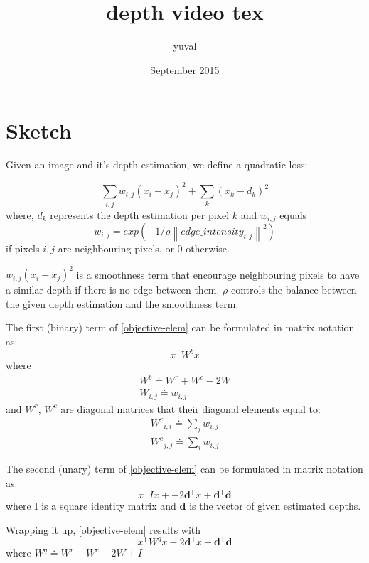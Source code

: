 \documentclass{article}
\title{depth video tex}
\author{yuval }
\date{September 2015}
\newcommand{\norm}[1]{\left\lVert #1 \right\rVert}
\newcommand\mat[1]{{#1}}
\newcommand{\T}{{}^\mathsf{T}}
\newcommand{\eqdef}{\doteq}
\renewcommand\vec[1]{\mathbf{#1}}
\begin{document}
\maketitle

\section{Sketch}

Given an image and it's depth estimation, we define a quadratic loss:

\begin{equation}
\sum_{i,j}{w_{i,j} (x_i  - x_j)^2} + \sum_{k}{(x_k - d_k)^2}
\label{objective-elem}
\end{equation}
where, $d_k$ represents the depth estimation per pixel $k$ and $w_{i,j}$ equals
\begin{equation}
w_{i,j} = exp(-1/\rho \norm{edge\_intensity_{i,j}}^2)
\end{equation}
if pixels $i,j$ are neighbouring pixels, or $0$ otherwise. 

${w_{i,j} (x_i  - x_j)^2}$ is a smoothness term that encourage neighbouring pixels to have a similar depth if there is no edge between them.
$\rho$ controls the balance between the given depth estimation and the smoothness term.

The first (binary) term of \eqref{objective-elem} can be formulated in matrix notation as:
\begin{equation}
x\T \mat{W^{b}} x
\end{equation}
where 
\begin{align}
\mat{W^{b}} \eqdef \mat{W^{r}} + \mat{W^{c}} - 2\mat{W}\\
\mat{W}_{i,j} \eqdef w_{i,j}
\end{align}
and $\mat{W^{r}}$, $\mat{W^{c}}$ are diagonal matrices that their diagonal elements equal to:
\begin{align}
\mat{W^{r}}_{i,i} \eqdef \sum_{j}{w_{i,j}}\\ \mat{W^{c}}_{j,j} \eqdef \sum_{i}{w_{i,j}} \end{align}

The second (unary) term of \eqref{objective-elem} can be formulated in matrix notation as:
\begin{equation}
x\T \mat{I} x + -2 \vec{d}\T x + \vec{d}\T \vec{d}
\end{equation}
where \mat{I} is a square identity matrix and $\vec{d}$ is the vector of given estimated depths.

Wrapping it up, \eqref{objective-elem} results with
\begin{equation}
x\T \mat{W}^{q} x - 2 \vec{d}\T x + \vec{d}\T \vec{d}
\end{equation}
where $\mat{W}^{q} \eqdef \mat{W^{r}} + \mat{W^{c}} - 2\mat{W} + \mat{I} $
\end{document}
